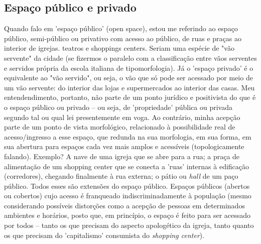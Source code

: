 \documentclass[]{report}
\begin{document}


	
	\subsection{Espaço público e privado}
	Quando falo em 'espaço público' (open space), estou me referindo ao espaço público, semi-público ou privativo com acesso ao público, de ruas e praças ao interior de igrejas. teatros e shoppings centers. Seriam uma espécie de "vão servente" da cidade (se fizermos o paralelo com a classificação entre vãos serventes e servidos própria da escola italiana de tipomorfologia). Já o 'espaço privado' é o equivalente ao "vão servido", ou seja, o vão que só pode ser acessado por meio de um vão servente: do interior das lojas e supermercados ao interior das casas. Meu entendendimento, portanto, não parte de um ponto jurídico e positivista do que é o espaço público ou privado – ou seja, de 'propriedade' pública ou privada segundo tal ou qual lei presentemente em voga. Ao contrário, minha acepção parte de um ponto de vista morfológico, relacionado à possibilidade real de acesso/ingresso a esse espaço, que redunda na sua morfologia, em sua forma, em sua abertura para espaços cada vez mais amplos e acessíveis (topologicamente falando). Exemplo? A nave de uma igreja que se abre para a rua; a praça de alimentação de um shopping center que se conecta a 'ruas' internas à edificação (corredores), chegando finalmente à rua externa; o pátio ou \textit{hall} de um paço público. Todos esses são extensões do espaço público. Espaços públicos (abertos ou cobertos) cujo acesso é franqueado indiscriminadamente à população (mesmo considerando possíveis distorções como a acepção de pessoas em determinados ambientes e horários, posto que, em princípio, o espaço é feito para ser acessado por todos – tanto os que precisam do aspecto apologético da igreja, tanto quanto os que precisam do 'capitalismo' consumista do \textit{shopping center}).
	
\end{document}
